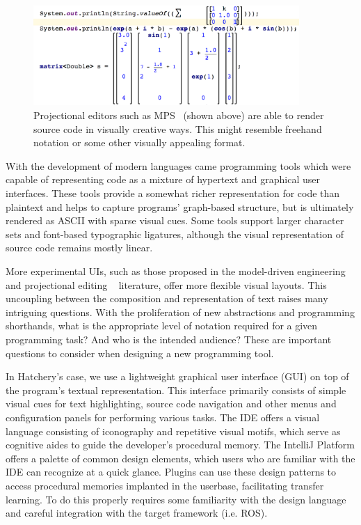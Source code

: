 \documentclass[12pt,initial,twoside,maitrise]{dms}
\numberwithin{equation}{section}
\numberwithin{table}{chapter}
\numberwithin{figure}{chapter}
\begin{document}
\begin{figure}
    \centering
    \includegraphics[width=0.90\textwidth]{mps_screenshot.png}
    \caption{Projectional editors such as MPS~\citep{voelter2010language, pech2013jetbrains} (shown above) are able to render source code in visually creative ways. This might resemble freehand notation or some other visually appealing format.}
    \label{fig:mps_screenshot}
\end{figure}

With the development of modern languages came programming tools which were capable of representing code as a mixture of hypertext and graphical user interfaces. These tools provide a somewhat richer representation for code than plaintext and helps to capture programs' graph-based structure, but is ultimately rendered as ASCII with sparse visual cues. Some tools support larger character sets and font-based typographic ligatures, although the visual representation of source code remains mostly linear.

More experimental UIs, such as those proposed in the model-driven engineering~\citep{famelis2015mummint} and projectional editing ~\citep{voelter2010language} literature, offer more flexible visual layouts. This uncoupling between the composition and representation of text raises many intriguing questions. With the proliferation of new abstractions and programming shorthands, what is the appropriate level of notation required for a given programming task? And who is the intended audience? These are important questions to consider when designing a new programming tool.

In Hatchery's case, we use a lightweight graphical user interface (GUI) on top of the program's textual representation. This interface primarily consists of simple visual cues for text highlighting, source code navigation and other menus and configuration panels for performing various tasks. The IDE offers a visual language consisting of iconography and repetitive visual motifs, which serve as cognitive aides to guide the developer's procedural memory. The IntelliJ Platform offers a palette of common design elements, which users who are familiar with the IDE can recognize at a quick glance. Plugins can use these design patterns to access procedural memories implanted in the userbase, facilitating transfer learning. To do this properly requires some familiarity with the design language and careful integration with the target framework (i.e. ROS).
\end{document}
